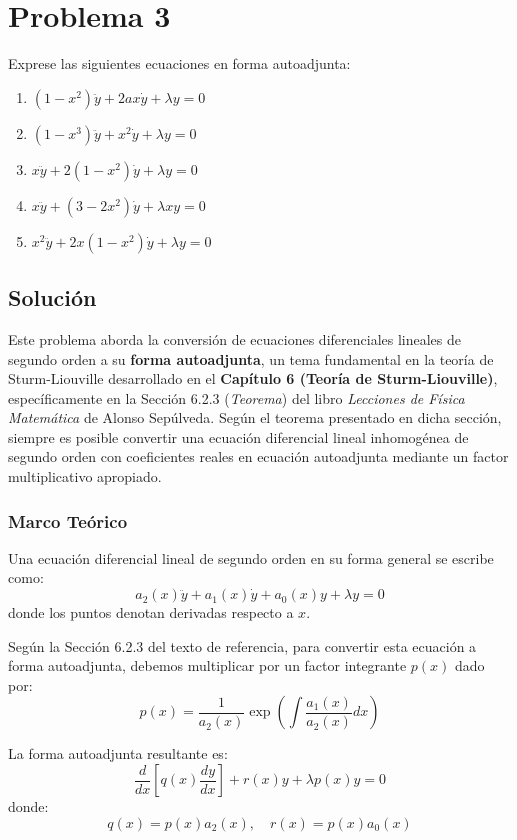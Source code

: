 \documentclass[a4paper]{article}
\begin{document}
\section{Problema 3}
Exprese las siguientes ecuaciones en forma autoadjunta:
\begin{enumerate}
    \item[(a)] $(1 - x^2)\ddot{y} + 2ax\dot{y} + \lambda y = 0$
    \item[(b)] $(1 - x^3)\ddot{y} + x^2\dot{y} + \lambda y = 0$
    \item[(c)] $x\ddot{y} + 2(1 - x^2)\dot{y} + \lambda y = 0$
    \item[(d)] $x\ddot{y} + (3 - 2x^2)\dot{y} + \lambda xy = 0$
    \item[(e)] $x^2\ddot{y} + 2x(1 - x^2)\dot{y} + \lambda y = 0$
\end{enumerate}

\subsection{Solución}

Este problema aborda la conversión de ecuaciones diferenciales lineales de segundo orden a su \textbf{forma autoadjunta}, un tema fundamental en la teoría de Sturm-Liouville desarrollado en el \textbf{Capítulo 6 (Teoría de Sturm-Liouville)}, específicamente en la Sección 6.2.3 (\textit{Teorema}) del libro \textit{Lecciones de Física Matemática} de Alonso Sepúlveda. Según el teorema presentado en dicha sección, siempre es posible convertir una ecuación diferencial lineal inhomogénea de segundo orden con coeficientes reales en ecuación autoadjunta mediante un factor multiplicativo apropiado.

\subsubsection{Marco Teórico}

Una ecuación diferencial lineal de segundo orden en su forma general se escribe como:
$$
a_2(x)\ddot{y} + a_1(x)\dot{y} + a_0(x)y + \lambda y = 0
$$
donde los puntos denotan derivadas respecto a $x$.

Según la Sección 6.2.3 del texto de referencia, para convertir esta ecuación a forma autoadjunta, debemos multiplicar por un factor integrante $p(x)$ dado por:
$$
p(x) = \frac{1}{a_2(x)} \exp\left(\int \frac{a_1(x)}{a_2(x)} dx\right)
$$

La forma autoadjunta resultante es:
$$
\frac{d}{dx}\left[q(x)\frac{dy}{dx}\right] + r(x)y + \lambda p(x)y = 0
$$
donde:
$$
q(x) = p(x)a_2(x), \quad r(x) = p(x)a_0(x)
$$
\end{document}
